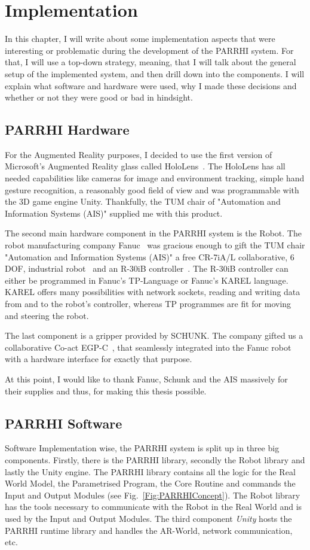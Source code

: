 \chapter{Implementation}\label{Chap:Implementation}

In this chapter, I will write about some implementation aspects that were interesting or problematic during the development of the PARRHI system. For that, I will use a top-down strategy, meaning, that I will talk about the general setup of the implemented system, and then drill down into the components. I will explain what software and hardware were used, why I made these decisions and whether or not they were good or bad in hindsight.

\section{PARRHI Hardware}
For the Augmented Reality purposes, I decided to use the first version of Microsoft's Augmented Reality glass called HoloLens~\cite{HoloLens}. The HoloLens has all needed capabilities like cameras for image and environment tracking, simple hand gesture recognition, a reasonably good field of view and was programmable with the 3D game engine Unity. Thankfully, the TUM chair of "Automation and Information Systems (AIS)" supplied me with this product.

The second main hardware component in the PARRHI system is the Robot. The robot manufacturing company Fanuc~\cite{Fanuc} was gracious enough to gift the TUM chair "Automation and Information Systems (AIS)" a free CR-7iA/L collaborative, 6 DOF, industrial robot~\cite{FanucCR7} and an R-30iB controller~\cite{FanucR30iB}. The R-30iB controller can either be programmed in Fanuc's TP-Language or Fanuc's KAREL language. KAREL offers many possibilities with network sockets, reading and writing data from and to the robot's controller, whereas TP programmes are fit for moving and steering the robot.

The last component is a gripper provided by SCHUNK. The company gifted us a collaborative Co-act EGP-C~\cite{SchunkGripper}, that seamlessly integrated into the Fanuc robot with a hardware interface for exactly that purpose. 

At this point, I would like to thank Fanuc, Schunk and the AIS massively for their supplies and thus, for making this thesis possible.

\section{PARRHI Software}\label{Section:PARRHIHardware}
Software Implementation wise, the PARRHI system is split up in three big components. Firstly, there is the PARRHI library, secondly the Robot library and lastly the Unity engine. The PARRHI library contains all the logic for the Real World Model, the Parametrised Program, the Core Routine and commands the Input and Output Modules (see Fig.~\ref{Fig:PARRHIConcept}). The Robot library has the tools necessary to communicate with the Robot in the Real World and is used by the Input and Output Modules. The third component \textit{Unity} hosts the PARRHI runtime library and handles the AR-World, network communication, etc.


